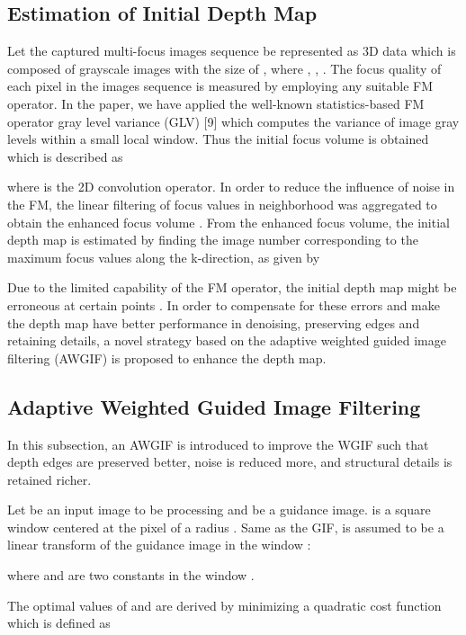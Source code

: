 \documentclass[a4paper,fleqn]{cas-dc}
\begin{document}
\subsection{Estimation of Initial Depth Map}\label{Initial}
Let the captured multi-focus images sequence be represented as 3D data  which is composed of  grayscale images with the size of , where , , . The focus quality of each pixel  in the images sequence is measured by employing any suitable FM operator. In the paper, we have applied the well-known statistics-based FM operator gray level variance (GLV) [9] which computes the variance of image gray levels within a small local window. Thus the initial focus volume  is obtained which is described as

where  is the 2D convolution operator. In order to reduce the influence of noise in the FM, the linear filtering of focus values in  neighborhood was aggregated to obtain the enhanced focus volume . From the enhanced focus volume, the initial depth map  is estimated by finding the image number corresponding to the maximum focus values along the k-direction, as given by


Due to the limited capability of the FM operator, the initial depth map might be erroneous at certain points \cite{pertuz2013analysis}. In order to compensate for these errors and make the depth map have better performance in denoising, preserving edges and retaining details, a novel strategy based on the adaptive weighted guided image filtering (AWGIF) is proposed to enhance the depth map.

\subsection{Adaptive Weighted Guided Image Filtering}\label{Adaptive}
In this subsection, an AWGIF is introduced to improve the WGIF such that depth edges are preserved better, noise is reduced more, and structural details is retained richer.

Let  be an input image to be processing and  be a guidance image.  is  a square window centered at the pixel 
of a radius . Same as  the GIF,  is assumed to be a linear transform of the guidance image  in the window :

where  and  are two constants in the
window .

The optimal values of  and  are derived by minimizing a quadratic cost function  which is defined as \cite{li2015weighted}
\end{document}
